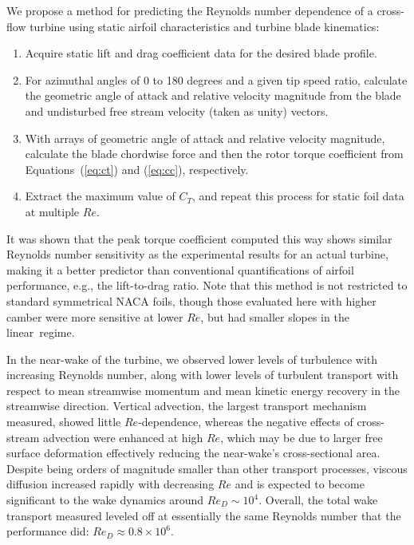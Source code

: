 We propose a method for predicting the Reynolds number dependence of a cross-flow
turbine using static airfoil characteristics and turbine blade kinematics:
\begin{enumerate}
    \item Acquire static lift and drag coefficient data for the desired blade
    profile.
    
    \item For azimuthal angles of 0 to 180 degrees and a given tip speed ratio,
    calculate the geometric angle of attack and relative velocity magnitude from
    the blade and undisturbed free stream velocity (taken as unity) vectors.
    
    \item With arrays of geometric angle of attack and relative velocity
    magnitude, calculate the blade chordwise force and then the rotor torque
    coefficient from Equations~(\ref{eq:ct}) and (\ref{eq:cc}), respectively.
    
    \item Extract the maximum value of $C_T$, and repeat this process for static
    foil data at multiple $Re$.
\end{enumerate}

It was shown that the peak torque coefficient computed this way shows similar
Reynolds number sensitivity as the experimental results for an actual turbine,
making it a better predictor than conventional quantifications of airfoil
performance, e.g., the lift-to-drag ratio. Note that this method is not
restricted to standard symmetrical NACA foils, though those evaluated here with
higher camber were more sensitive at lower $Re$, but had smaller slopes in the
linear~regime.

In the near-wake of the turbine, we observed lower levels of turbulence with
increasing Reynolds number, along with lower levels of turbulent transport with
respect to mean streamwise momentum and mean kinetic energy recovery in the
streamwise direction. Vertical advection, the largest transport mechanism
measured, showed little $Re$-dependence, whereas the negative effects of
cross-stream advection were enhanced at high $Re$, which may be due to larger
free surface deformation effectively reducing the near-wake's cross-sectional
area. Despite being orders of magnitude smaller than other transport processes,
viscous diffusion increased rapidly with decreasing $Re$ and is expected to
become significant to the wake dynamics around $Re_D \sim 10^4$. Overall, the
total wake transport measured leveled off at essentially the same Reynolds
number that the performance did: $Re_D \approx 0.8 \times 10^6$.

